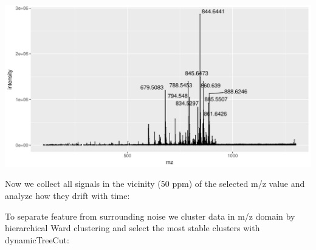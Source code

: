 \documentclass[]{article}
\newenvironment{Shaded}{\begin{snugshade}}{\end{snugshade}}
\newcommand{\KeywordTok}[1]{\textcolor[rgb]{0.13,0.29,0.53}{\textbf{#1}}}
\newcommand{\FloatTok}[1]{\textcolor[rgb]{0.00,0.00,0.81}{#1}}
\newcommand{\StringTok}[1]{\textcolor[rgb]{0.31,0.60,0.02}{#1}}
\newcommand{\OperatorTok}[1]{\textcolor[rgb]{0.81,0.36,0.00}{\textbf{#1}}}
\newcommand{\NormalTok}[1]{#1}
\begin{document}
\includegraphics{Supplementary_document_files/figure-latex/ion.plots.651-1.pdf}

Now we collect all signals in the vicinity (50 ppm) of the selected m/z
value and analyze how they drift with time:

\begin{Shaded}
\end{Shaded}

To separate feature from surrounding noise we cluster data in m/z domain
by hierarchical Ward clustering and select the most stable clusters with
dynamicTreeCut:
\end{document}
